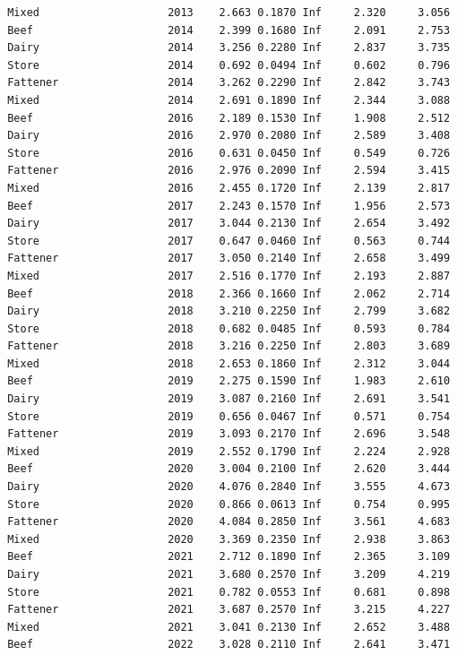 \documentclass[
  letterpaper,
  DIV=11,
  numbers=noendperiod]{scrreprt}
\begin{document}
\begin{verbatim}
 Mixed                    2013    2.663 0.1870 Inf     2.320     3.056
 Beef                     2014    2.399 0.1680 Inf     2.091     2.753
 Dairy                    2014    3.256 0.2280 Inf     2.837     3.735
 Store                    2014    0.692 0.0494 Inf     0.602     0.796
 Fattener                 2014    3.262 0.2290 Inf     2.842     3.743
 Mixed                    2014    2.691 0.1890 Inf     2.344     3.088
 Beef                     2016    2.189 0.1530 Inf     1.908     2.512
 Dairy                    2016    2.970 0.2080 Inf     2.589     3.408
 Store                    2016    0.631 0.0450 Inf     0.549     0.726
 Fattener                 2016    2.976 0.2090 Inf     2.594     3.415
 Mixed                    2016    2.455 0.1720 Inf     2.139     2.817
 Beef                     2017    2.243 0.1570 Inf     1.956     2.573
 Dairy                    2017    3.044 0.2130 Inf     2.654     3.492
 Store                    2017    0.647 0.0460 Inf     0.563     0.744
 Fattener                 2017    3.050 0.2140 Inf     2.658     3.499
 Mixed                    2017    2.516 0.1770 Inf     2.193     2.887
 Beef                     2018    2.366 0.1660 Inf     2.062     2.714
 Dairy                    2018    3.210 0.2250 Inf     2.799     3.682
 Store                    2018    0.682 0.0485 Inf     0.593     0.784
 Fattener                 2018    3.216 0.2250 Inf     2.803     3.689
 Mixed                    2018    2.653 0.1860 Inf     2.312     3.044
 Beef                     2019    2.275 0.1590 Inf     1.983     2.610
 Dairy                    2019    3.087 0.2160 Inf     2.691     3.541
 Store                    2019    0.656 0.0467 Inf     0.571     0.754
 Fattener                 2019    3.093 0.2170 Inf     2.696     3.548
 Mixed                    2019    2.552 0.1790 Inf     2.224     2.928
 Beef                     2020    3.004 0.2100 Inf     2.620     3.444
 Dairy                    2020    4.076 0.2840 Inf     3.555     4.673
 Store                    2020    0.866 0.0613 Inf     0.754     0.995
 Fattener                 2020    4.084 0.2850 Inf     3.561     4.683
 Mixed                    2020    3.369 0.2350 Inf     2.938     3.863
 Beef                     2021    2.712 0.1890 Inf     2.365     3.109
 Dairy                    2021    3.680 0.2570 Inf     3.209     4.219
 Store                    2021    0.782 0.0553 Inf     0.681     0.898
 Fattener                 2021    3.687 0.2570 Inf     3.215     4.227
 Mixed                    2021    3.041 0.2130 Inf     2.652     3.488
 Beef                     2022    3.028 0.2110 Inf     2.641     3.471

\end{verbatim}
\end{document}
